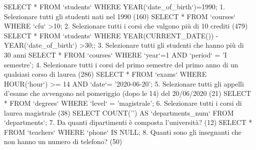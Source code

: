 SELECT * FROM `students` WHERE YEAR(`date_of_birth`)=1990; 1. Selezionare tutti gli studenti nati nel 1990 (160)
SELECT * FROM `courses` WHERE `cfu` >10;  2. Selezionare tutti i corsi che valgono più di 10 crediti (479)
SELECT * FROM `students` WHERE YEAR(CURRENT_DATE()) - YEAR(`date_of_birth`) >30;; 3. Selezionare tutti gli studenti che hanno più di 30 anni 
SELECT * FROM `courses` WHERE `year`=1 AND `period` = 'I semestre'; 4. Selezionare tutti i corsi del primo semestre del primo anno di un qualsiasi corso di
laurea (286)
SELECT * FROM `exams` WHERE HOUR(`hour`) >= 14 AND `date`= '2020-06-20'; 5. Selezionare tutti gli appelli d'esame che avvengono nel pomeriggio (dopo le 14) del
20/06/2020 (21)
SELECT * FROM `degrees` WHERE `level` = 'magistrale'; 6. Selezionare tutti i corsi di laurea magistrale (38)
SELECT COUNT('') AS `departments_num` FROM `departments`; 7. Da quanti dipartimenti è composta l'università? (12)
SELECT * FROM `teachers` WHERE `phone` IS NULL; 8. Quanti sono gli insegnanti che non hanno un numero di telefono? (50)